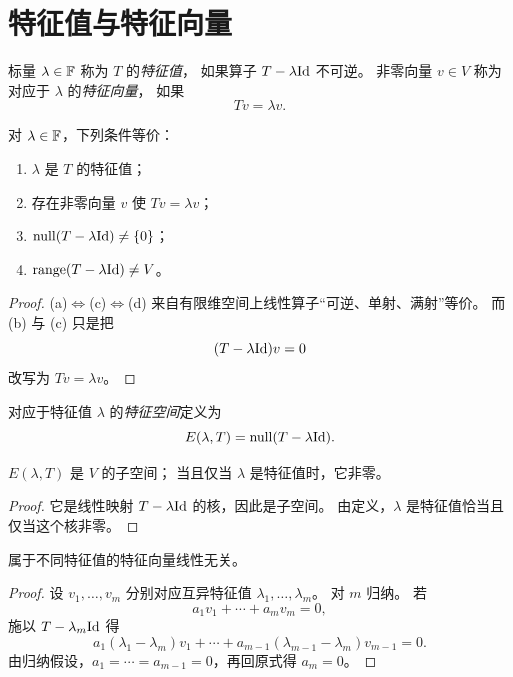 \section{特征值与特征向量}

\begin{definition}
标量 $\lambda\in\mathbb{F}$ 称为 $T$ 的\emph{特征值}，
如果算子 $T-\lambda\mathrm{Id}$ 不可逆。
非零向量 $v\in V$ 称为对应于 $\lambda$ 的\emph{特征向量}，
如果
\[
Tv=\lambda v.
\]
\end{definition}

\begin{proposition}
对 $\lambda\in\mathbb{F}$，下列条件等价：
\begin{enumerate}[label=(\alph*)]
\item $\lambda$ 是 $T$ 的特征值；
\item 存在非零向量 $v$ 使 $Tv=\lambda v$；
\item $\mathrm{null}(T-\lambda\mathrm{Id})\neq\{0\}$；
\item $\mathrm{range}(T-\lambda\mathrm{Id})\neq V$。
\end{enumerate}
\end{proposition}

\begin{proof}
(a)$\Leftrightarrow$(c)$\Leftrightarrow$(d) 来自有限维空间上线性算子“可逆、单射、满射”等价。
而 (b) 与 (c) 只是把
\[
(T-\lambda\mathrm{Id})v=0
\]
改写为 $Tv=\lambda v$。
\end{proof}

\begin{definition}
对应于特征值 $\lambda$ 的\emph{特征空间}定义为
\[
E(\lambda,T)=\mathrm{null}(T-\lambda\mathrm{Id}).
\]
\end{definition}

\begin{proposition}
$E(\lambda,T)$ 是 $V$ 的子空间；
当且仅当 $\lambda$ 是特征值时，它非零。
\end{proposition}

\begin{proof}
它是线性映射 $T-\lambda\mathrm{Id}$ 的核，因此是子空间。
由定义，$\lambda$ 是特征值恰当且仅当这个核非零。
\end{proof}

\begin{lemma}
属于不同特征值的特征向量线性无关。
\end{lemma}

\begin{proof}
设 $v_1,\dots,v_m$ 分别对应互异特征值 $\lambda_1,\dots,\lambda_m$。
对 $m$ 归纳。
若
\[
a_1v_1+\cdots+a_mv_m=0,
\]
施以 $T-\lambda_m\mathrm{Id}$ 得
\[
a_1(\lambda_1-\lambda_m)v_1+\cdots+a_{m-1}(\lambda_{m-1}-\lambda_m)v_{m-1}=0.
\]
由归纳假设，$a_1=\cdots=a_{m-1}=0$，再回原式得 $a_m=0$。
\end{proof}

